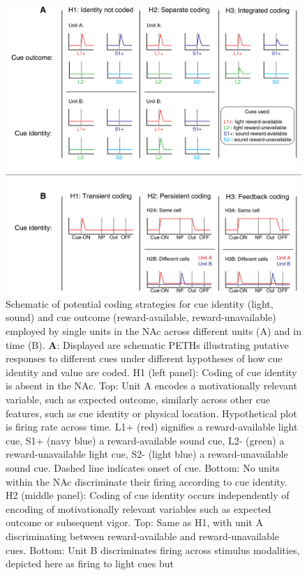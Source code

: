 \documentclass[11pt]{article}
\newcommand{\bsf}[1]{\textbf{#1}}
\begin{document}
\begin{figure}[h]
\centering
\includegraphics[height=0.5\textheight]{Fig 1 - Schematic neural.png}
\caption{Schematic of potential coding strategies for cue identity (light,
  sound) and cue outcome (reward-available, reward-unavailable) employed by
  single units in the NAc across different units (A) and in time (B). \bsf{A}: Displayed are schematic PETHs illustrating
  putative responses to different cues under different hypotheses of how cue
  identity and value are coded. H1 (left panel): Coding of cue identity is
  absent in the NAc. Top: Unit A encodes a motivationally relevant variable,
  such as expected outcome, similarly across other cue features, such as cue
  identity or physical location. Hypothetical plot is firing rate across
  time. L1+ (red) signifies a reward-available light cue, S1+ (navy blue) a
  reward-available sound cue, L2- (green) a reward-unavailable light cue, S2-
  (light blue) a reward-unavailable sound cue. Dashed line indicates onset of
  cue. Bottom: No units within the NAc discriminate their firing according to
  cue identity. H2 (middle panel): Coding of cue identity occurs independently
  of encoding of motivationally relevant variables such as expected outcome or
  subsequent vigor. Top: Same as H1, with unit A discriminating between
  reward-available and reward-unavailable cues. Bottom: Unit B discriminates
  firing across stimulus modalities, depicted here as firing to light cues but
}
\end{figure}
\end{document}
